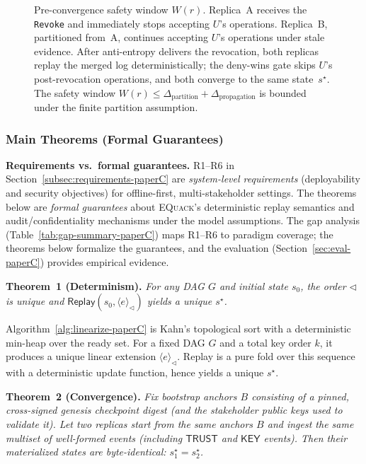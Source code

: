 \documentclass[10pt,journal,compsoc]{IEEEtran}
\newcommand{\equack}{\textsc{EQuack}}
\begin{document}
\begin{figure}[htbp]
\centering
\resizebox{\textwidth}{!}{}
\caption{Pre-convergence safety window $W(r)$. Replica~A receives the \texttt{Revoke} and immediately stops accepting $U$'s operations. Replica~B, partitioned from~A, continues accepting $U$'s operations under stale evidence. After anti-entropy delivers the revocation, both replicas replay the merged log deterministically; the deny-wins gate skips $U$'s post-revocation operations, and both converge to the same state~$s^\star$. The safety window $W(r) \leq \Delta_{\mathrm{partition}} + \Delta_{\mathrm{propagation}}$ is bounded under the finite partition assumption.}
\label{fig:safety-window-paperC}
\end{figure}

\subsubsection{Main Theorems (Formal Guarantees)}

\noindent\textbf{Requirements vs.\ formal guarantees.}
R1--R6 in Section~\ref{subsec:requirements-paperC} are \emph{system-level requirements} (deployability and security objectives) for offline-first, multi-stakeholder settings.
The theorems below are \emph{formal guarantees} about \equack{}'s deterministic replay semantics and audit/confidentiality mechanisms under the model assumptions.
The gap analysis (Table~\ref{tab:gap-summary-paperC}) maps R1--R6 to paradigm coverage; the theorems below formalize the guarantees, and the evaluation (Section~\ref{sec:eval-paperC}) provides empirical evidence.

\noindent\textbf{Theorem~1 (Determinism).}
\textit{For any DAG $G$ and initial state $s_0$, the order $\triangleleft$ is unique and
$\mathsf{Replay}(s_0,\langle e\rangle_{\triangleleft})$ yields a unique $s^\star$.}


Algorithm~\ref{alg:linearize-paperC} is Kahn's topological sort with a deterministic min-heap over the ready set. For a fixed DAG $G$ and a total key order $k$, it produces a unique linear extension $\langle e\rangle_{\triangleleft}$. Replay is a pure fold over this sequence with a deterministic update function, hence yields a unique $s^\star$.

\medskip
\noindent\textbf{Theorem~2 (Convergence).}
\textit{Fix bootstrap anchors $B$ consisting of a pinned, cross-signed genesis checkpoint digest (and the stakeholder public keys used to validate it).
Let two replicas start from the same anchors $B$ and ingest the same multiset of well-formed events (including $\mathsf{TRUST}$ and $\mathsf{KEY}$ events).
Then their materialized states are byte-identical: $s^\star_1 = s^\star_2$.}
\end{document}

